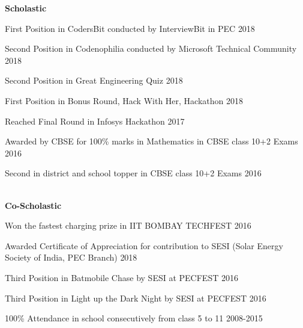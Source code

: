  
\begin{entryulist}
\Large\textbf{Scholastic}
\vspace{5mm}
\\
\entryu

{First Position {\normalfont in CodersBit conducted by InterviewBit in PEC }}
{2018}
\entryu

{Second Position {\normalfont in Codenophilia conducted by Microsoft Technical Community }}
{2018}

\entryu

{Second Position {\normalfont in Great Engineering Quiz}}
{2018}

\entryu

{First Position {\normalfont in Bonus Round, Hack With Her, Hackathon}}
{2018}


\entryu

{Reached Final Round {\normalfont in Infosys Hackathon}}
{2017}



\entryu

{Awarded by CBSE for 100\% marks in Mathematics {\normalfont in CBSE class 10+2 Exams}}
{2016}


\entryu

{Second in district and school topper {\normalfont in CBSE class 10+2 Exams}}
{2016}


\\
\Large\textbf{Co-Scholastic}
\vspace{5mm}
\\

\entryu

{Won the fastest charging prize {\normalfont in IIT BOMBAY TECHFEST }}
{2016}

\entryu

{Awarded Certificate of Appreciation {\normalfont for contribution to SESI (Solar Energy Society of India, PEC Branch)}}
{2018}

\entryu

{Third Position {\normalfont in Batmobile Chase by SESI at PECFEST}}
{2016}


\entryu

{Third Position {\normalfont in Light up the Dark Night by SESI at PECFEST}}
{2016}


\entryu

{100\% Attendance {\normalfont in school consecutively from class 5 to 11}}
{2008-2015}


\end{entryulist}